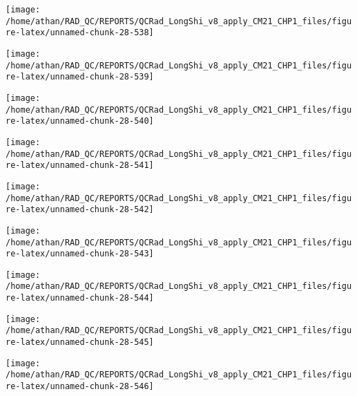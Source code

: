 \documentclass[
  10pt,
  a4paper,oneside]{article}
\begin{document}
\begin{center}\texttt{[image: /home/athan/RAD\_QC/REPORTS/QCRad\_LongShi\_v8\_apply\_CM21\_CHP1\_files/figure-latex/unnamed-chunk-28-538]} \end{center}

\begin{center}\texttt{[image: /home/athan/RAD\_QC/REPORTS/QCRad\_LongShi\_v8\_apply\_CM21\_CHP1\_files/figure-latex/unnamed-chunk-28-539]} \end{center}

\begin{center}\texttt{[image: /home/athan/RAD\_QC/REPORTS/QCRad\_LongShi\_v8\_apply\_CM21\_CHP1\_files/figure-latex/unnamed-chunk-28-540]} \end{center}

\begin{center}\texttt{[image: /home/athan/RAD\_QC/REPORTS/QCRad\_LongShi\_v8\_apply\_CM21\_CHP1\_files/figure-latex/unnamed-chunk-28-541]} \end{center}

\begin{center}\texttt{[image: /home/athan/RAD\_QC/REPORTS/QCRad\_LongShi\_v8\_apply\_CM21\_CHP1\_files/figure-latex/unnamed-chunk-28-542]} \end{center}

\begin{center}\texttt{[image: /home/athan/RAD\_QC/REPORTS/QCRad\_LongShi\_v8\_apply\_CM21\_CHP1\_files/figure-latex/unnamed-chunk-28-543]} \end{center}

\begin{center}\texttt{[image: /home/athan/RAD\_QC/REPORTS/QCRad\_LongShi\_v8\_apply\_CM21\_CHP1\_files/figure-latex/unnamed-chunk-28-544]} \end{center}

\begin{center}\texttt{[image: /home/athan/RAD\_QC/REPORTS/QCRad\_LongShi\_v8\_apply\_CM21\_CHP1\_files/figure-latex/unnamed-chunk-28-545]} \end{center}

\begin{center}\texttt{[image: /home/athan/RAD\_QC/REPORTS/QCRad\_LongShi\_v8\_apply\_CM21\_CHP1\_files/figure-latex/unnamed-chunk-28-546]} \end{center}
\end{document}
